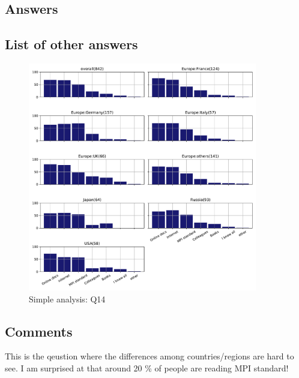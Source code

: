 
\subsection{Answers}


\subsection{List of other answers}
\begin{itemize}

\end{itemize}

\begin{figure}[htb]
\begin{center}
\includegraphics[width=10cm]{../pdfs/Q14.pdf}
\caption{Simple analysis: Q14}
\label{fig:Q14}
\end{center}
\end{figure}

\subsection{Comments}

This is the qeustion where the differences among countries/regions are
hard to see.  I am surprised at that around 20 \% of people are
reading MPI standard! 
